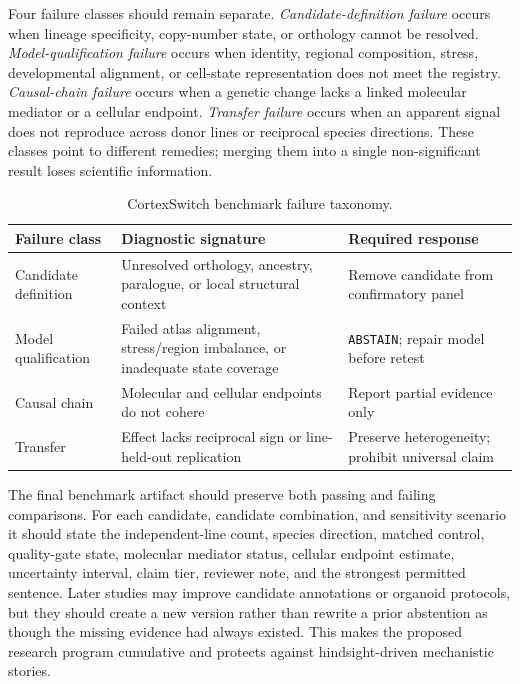 \documentclass[conference]{IEEEtran}
\newcommand{\abstain}{\texttt{ABSTAIN}}
\begin{document}
Four failure classes should remain separate. \emph{Candidate-definition failure} occurs when lineage specificity, copy-number state, or orthology cannot be resolved. \emph{Model-qualification failure} occurs when identity, regional composition, stress, developmental alignment, or cell-state representation does not meet the registry. \emph{Causal-chain failure} occurs when a genetic change lacks a linked molecular mediator or a cellular endpoint. \emph{Transfer failure} occurs when an apparent signal does not reproduce across donor lines or reciprocal species directions. These classes point to different remedies; merging them into a single non-significant result loses scientific information.

\begin{table}[t]
\caption{CortexSwitch benchmark failure taxonomy.}
\label{tab:taxonomy}
\centering
\scriptsize
\renewcommand{\arraystretch}{1.08}
\begin{tabular}{|p{}|p{}|p{}|}
\hline
\textbf{Failure class} & \textbf{Diagnostic signature} & \textbf{Required response} \\
\hline
Candidate definition & Unresolved orthology, ancestry, paralogue, or local structural context & Remove candidate from confirmatory panel \\
\hline
Model qualification & Failed atlas alignment, stress/region imbalance, or inadequate state coverage & \abstain{}; repair model before retest \\
\hline
Causal chain & Molecular and cellular endpoints do not cohere & Report partial evidence only \\
\hline
Transfer & Effect lacks reciprocal sign or line-held-out replication & Preserve heterogeneity; prohibit universal claim \\
\hline
\end{tabular}
\end{table}

The final benchmark artifact should preserve both passing and failing comparisons. For each candidate, candidate combination, and sensitivity scenario it should state the independent-line count, species direction, matched control, quality-gate state, molecular mediator status, cellular endpoint estimate, uncertainty interval, claim tier, reviewer note, and the strongest permitted sentence. Later studies may improve candidate annotations or organoid protocols, but they should create a new version rather than rewrite a prior abstention as though the missing evidence had always existed. This makes the proposed research program cumulative and protects against hindsight-driven mechanistic stories.
\end{document}
